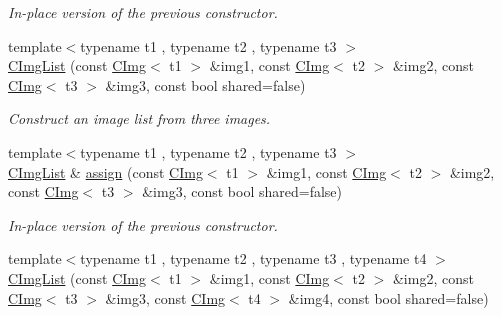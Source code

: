 \begin{DoxyCompactItemize}
\begin{DoxyCompactList}\small\item\em In-\/place version of the previous constructor. \end{DoxyCompactList}\item 
\hypertarget{structcimg__library_1_1_c_img_list_ac0102171c87c3ce8691b736a51681d01}{{\footnotesize template$<$typename t1 , typename t2 , typename t3 $>$ }\\\hyperlink{structcimg__library_1_1_c_img_list_ac0102171c87c3ce8691b736a51681d01}{C\-Img\-List} (const \hyperlink{structcimg__library_1_1_c_img}{C\-Img}$<$ t1 $>$ \&img1, const \hyperlink{structcimg__library_1_1_c_img}{C\-Img}$<$ t2 $>$ \&img2, const \hyperlink{structcimg__library_1_1_c_img}{C\-Img}$<$ t3 $>$ \&img3, const bool shared=false)}\label{structcimg__library_1_1_c_img_list_ac0102171c87c3ce8691b736a51681d01}

\begin{DoxyCompactList}\small\item\em Construct an image list from three images. \end{DoxyCompactList}\item 
\hypertarget{structcimg__library_1_1_c_img_list_afe13a9cb1a8f8e2177ba3bee2bfb67ee}{{\footnotesize template$<$typename t1 , typename t2 , typename t3 $>$ }\\\hyperlink{structcimg__library_1_1_c_img_list}{C\-Img\-List} \& \hyperlink{structcimg__library_1_1_c_img_list_afe13a9cb1a8f8e2177ba3bee2bfb67ee}{assign} (const \hyperlink{structcimg__library_1_1_c_img}{C\-Img}$<$ t1 $>$ \&img1, const \hyperlink{structcimg__library_1_1_c_img}{C\-Img}$<$ t2 $>$ \&img2, const \hyperlink{structcimg__library_1_1_c_img}{C\-Img}$<$ t3 $>$ \&img3, const bool shared=false)}\label{structcimg__library_1_1_c_img_list_afe13a9cb1a8f8e2177ba3bee2bfb67ee}

\begin{DoxyCompactList}\small\item\em In-\/place version of the previous constructor. \end{DoxyCompactList}\item 
\hypertarget{structcimg__library_1_1_c_img_list_a8578d944cca8b6527fef0efda54d5a44}{{\footnotesize template$<$typename t1 , typename t2 , typename t3 , typename t4 $>$ }\\\hyperlink{structcimg__library_1_1_c_img_list_a8578d944cca8b6527fef0efda54d5a44}{C\-Img\-List} (const \hyperlink{structcimg__library_1_1_c_img}{C\-Img}$<$ t1 $>$ \&img1, const \hyperlink{structcimg__library_1_1_c_img}{C\-Img}$<$ t2 $>$ \&img2, const \hyperlink{structcimg__library_1_1_c_img}{C\-Img}$<$ t3 $>$ \&img3, const \hyperlink{structcimg__library_1_1_c_img}{C\-Img}$<$ t4 $>$ \&img4, const bool shared=false)}\label{structcimg__library_1_1_c_img_list_a8578d944cca8b6527fef0efda54d5a44}


\end{DoxyCompactItemize}
